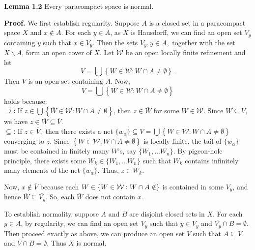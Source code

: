 \documentclass{article}
\begin{document}
\textbf{Lemma 1.2}  Every paracompact space is normal. 

\vskip 10pt

\textbf{Proof.} We first establish regularity. Suppose $A$ is a closed set in a paracompact space $X$ and $x\notin A$. For each $y\in A$, as $X$ is Hausdorff, we can find an open set $V_y$ containing $y$ such that $x\in \overline{V_y}$. Then the sets $V_y, y\in A,$ together with the set $X\backslash A$, form an open cover of $X$. Let $\mathcal{W}$ be an open locally finite refinement and let 
$$V=\bigcup\left\{ W\in \mathcal{W}: W\cap A\neq \emptyset\right\}.$$
Then $V$ is an open set containing $A$. Now, 
$$\overline{V}=\bigcup\left\{ \overline{W}\in \mathcal{W}: W\cap A\neq \emptyset\right\}$$ holds because:\\
\textbf{$\supseteq$:} If $z\in \bigcup\left\{ \overline{W}\in \mathcal{W}: W\cap A\neq \emptyset\right\}$, then $z\in \overline{W}$ for some $W \in \mathcal{W}.$ Since $W\subseteq V$, we have $z\in \overline{W}\subseteq \overline{V}.$\\
\textbf{$\subseteq$:} If $z\in \overline{V},$ then there exists a net $\{w_\alpha\}\subseteq V=\bigcup\left\{ W\in \mathcal{W}: W\cap A\neq \emptyset\right\}$ converging to $z$. Since $\left\{W\in \mathcal{W}: W\cap A \neq \emptyset\right\}$ is locally finite, the tail of $\{w_\alpha\}$ must be contained in finitely many $W$'s, say $\{W_1,\dots W_n\}$. By pigeon-hole principle, there exists some $W_k\in \{W_1,\dots W_n\}$
such that $W_k$ contains infinitely many elements of the net $\{w_\alpha\}.$ Thus, $z\in \overline{W_k}$.
\vskip 15pt

Now, $x\notin \overline{V}$ because each $W\in \left\{W\in \mathcal{W}: W\cap A \notin \empty \right\}$ is contained in some $V_y$, and hence 
$\overline{W}\subseteq \overline{V_y}$. So, each $\overline{W}$ does not contain $x$. 

\vskip 15pt

To establish normality, suppose $A$ and $B$ are disjoint closed sets in $X$. For each $y\in A$, by regularity, 
we can find an open set $V_y$ such that $y\in V_y$ and $\overline{V_y}\cap B= \emptyset$. Then proceed exactly as above, we can 
produce an open set $V$ such that $A\subseteq V$ and $\overline{V}\cap B=\emptyset.$ Thus $X$ is normal.
\end{document}

